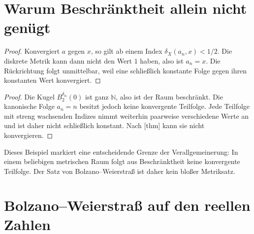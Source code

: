 \documentclass[main.tex]{subfiles}
\begin{document}
\section{Warum Beschränktheit allein nicht genügt}

\begin{proof}
Konvergiert \(a\) gegen \(x\), so gilt ab einem Index
\(\delta_X(a_n,x)<1/2\). Die diskrete Metrik kann dann nicht den Wert \(1\)
haben, also ist \(a_n=x\). Die Rückrichtung folgt unmittelbar, weil eine
schließlich konstante Folge gegen ihren konstanten Wert konvergiert.
\end{proof}

\begin{proof}
Die Kugel \(B_2^{\delta_{\mathbb N}}(0)\) ist ganz \(\mathbb N\), also ist
der Raum beschränkt. Die kanonische Folge \(a_n=n\) besitzt jedoch keine
konvergente Teilfolge. Jede Teilfolge mit streng wachsenden Indizes nimmt
weiterhin paarweise verschiedene Werte an und ist daher nicht schließlich
konstant. Nach
[thm] kann sie
nicht konvergieren.
\end{proof}

Dieses Beispiel markiert eine entscheidende Grenze der Verallgemeinerung:
In einem beliebigen metrischen Raum folgt aus Beschränktheit keine
konvergente Teilfolge. Der Satz von Bolzano--Weierstraß ist daher kein bloßer
Metriksatz.

\section{Bolzano--Weierstraß auf den reellen Zahlen}
\end{document}
